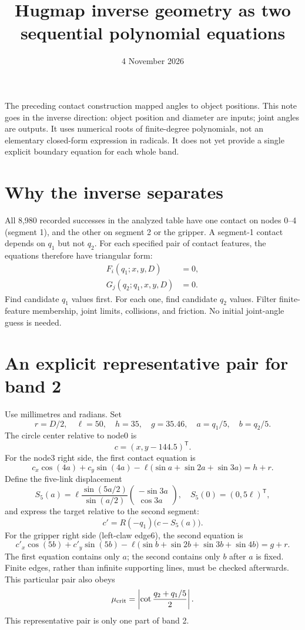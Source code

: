 \documentclass{article}
\title{Hugmap inverse geometry as two sequential polynomial equations}
\author{}\date{4 November 2026}
\begin{document}
\maketitle
\noindent The preceding contact construction mapped angles to object positions. This note goes in the inverse direction: object position and diameter are inputs; joint angles are outputs. It uses numerical roots of finite-degree polynomials, not an elementary closed-form expression in radicals. It does not yet provide a single explicit boundary equation for each whole band.

\section{Why the inverse separates}
All 8,980 recorded successes in the analyzed table have one contact on nodes 0--4 (segment 1), and the other on segment 2 or the gripper. A segment-1 contact depends on $q_1$ but not $q_2$. For each specified pair of contact features, the equations therefore have triangular form:
\[
\boxed{\begin{aligned}
F_i(q_1;x,y,D)&=0,\\
G_j(q_2;q_1,x,y,D)&=0.
\end{aligned}}
\]
Find candidate $q_1$ values first. For each one, find candidate $q_2$ values. Filter finite-feature membership, joint limits, collisions, and friction. No initial joint-angle guess is needed.

\section{An explicit representative pair for band 2}
Use millimetres and radians. Set
\[
r=D/2,\quad \ell=50,\quad h=35,\quad g=35.46,
\quad a=q_1/5,\quad b=q_2/5.
\]
The circle center relative to node0 is
\[
c=(x,y-144.5)^\mathsf T.
\]
For the node3 right side, the first contact equation is
\[
\boxed{c_x\cos(4a)+c_y\sin(4a)
-\ell\bigl(\sin a+\sin2a+\sin3a\bigr)=h+r.}
\]
Define the five-link displacement
\[
S_5(a)=\ell\frac{\sin(5a/2)}{\sin(a/2)}
\begin{pmatrix}-\sin3a\\\cos3a\end{pmatrix},
\quad S_5(0)=(0,5\ell)^\mathsf T,
\]
and express the target relative to the second segment:
\[
c'=R(-q_1)\bigl(c-S_5(a)\bigr).
\]
For the gripper right side (left-claw edge6), the second equation is
\[
\boxed{c'_x\cos(5b)+c'_y\sin(5b)
-\ell\bigl(\sin b+\sin2b+\sin3b+\sin4b\bigr)=g+r.}
\]
The first equation contains only $a$; the second contains only $b$ after $a$ is fixed. Finite edges, rather than infinite supporting lines, must be checked afterwards. This particular pair also obeys
\[
\mu_{\rm crit}=\left|\cot\frac{q_2+q_1/5}{2}\right|.
\]
This representative pair is only one part of band 2.
\end{document}
